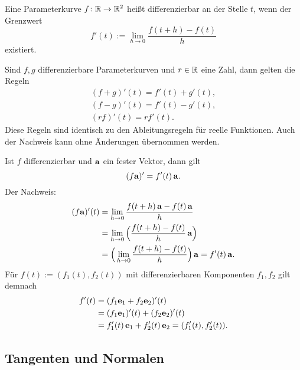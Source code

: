  Eine Parameterkurve $f\colon\mathbb R\to\mathbb R^2$ heißt
differenzierbar an der Stelle $t$, wenn der Grenzwert%
\begin{equation}
f'(t) := \lim_{h\to 0}\frac{f(t+h)-f(t)}{h}
\end{equation}
existiert.

Sind $f,g$ differenzierbare Parameterkurven und $r\in\mathbb R$ eine Zahl,
dann gelten die Regeln%
\begin{gather}
(f+g)'(t) = f'(t)+g'(t),\\
(f-g)'(t) = f'(t)-g'(t),\\
(rf)'(t) = rf'(t).
\end{gather}
Diese Regeln sind identisch zu den Ableitungsregeln für reelle
Funktionen. Auch der Nachweis kann ohne Änderungen übernommen
werden.

Ist $f$ differenzierbar und $\mathbf{a}$ ein fester Vektor, dann gilt%
\begin{equation}
(f\mathbf{a})' = f'(t)\,\mathbf{a}.
\end{equation}
Der Nachweis:
\begin{align*}
(f\mathbf{a})'(t) &= \lim_{h\to 0}\frac{f(t+h)\,\mathbf{a}-f(t)\,\mathbf{a}}{h}\\
&= \lim_{h\to 0}\Big(\frac{f(t+h)-f(t)}{h}\,\mathbf{a}\Big)\\
&= \Big(\lim_{h\to 0}\frac{f(t+h)-f(t)}{h}\Big)\,\mathbf{a}
= f'(t)\,\mathbf{a}.
\end{align*}
Für $f(t):=(f_1(t),f_2(t))$ mit differenzierbaren Komponenten
$f_1,f_2$ gilt demnach
\begin{align*}
f'(t) &= (f_1\mathbf{e}_1+f_2\mathbf{e}_2)'(t)\\
&= (f_1\mathbf{e}_1)'(t)+(f_2\mathbf{e}_2)'(t)\\
&= f_1'(t)\,\mathbf{e}_1+f_2'(t)\,\mathbf{e}_2 = (f_1'(t),f_2'(t)).
\end{align*}

\subsection{Tangenten und Normalen}

